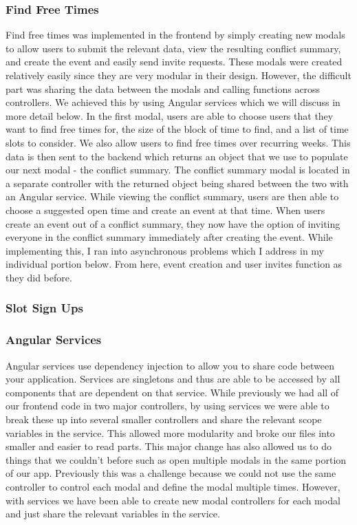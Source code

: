 \documentclass[11pt]{article}   %
\begin{document}
\subsubsection{Find Free Times}
Find free times was implemented in the frontend by simply creating new modals to allow users to submit the relevant data, view the resulting conflict summary, and create the event and easily send invite requests. These modals were created relatively easily since they are very modular in their design. However, the difficult part was sharing the data between the modals and calling functions across controllers. We achieved this by using Angular services which we will discuss in more detail below. In the first modal, users are able to choose users that they want to find free times for, the size of the block of time to find, and a list of time slots to consider. We also allow users to find free times over recurring weeks. This data is then sent to the backend which returns an object that we use to populate our next modal - the conflict summary. The conflict summary modal is located in a separate controller with the returned object being shared between the two with an Angular service. While viewing the conflict summary, users are then able to choose a suggested open time and create an event at that time. When users create an event out of a conflict summary, they now have the option of inviting everyone in the conflict summary immediately after creating the event. While implementing this, I ran into asynchronous problems which I address in my individual portion below. From here, event creation and user invites function as they did before.

\subsubsection{Slot Sign Ups}

\subsubsection{Angular Services}

Angular services use dependency injection to allow you to share code between your application. Services are singletons and thus are able to be accessed by all components that are dependent on that service. While previously we had all of our frontend code in two major controllers, by using services we were able to break these up into several smaller controllers and share the relevant scope variables in the service. This allowed more modularity and broke our files into smaller and easier to read parts. This major change has also allowed us to do things that we couldn't before such as open multiple modals in the same portion of our app. Previously this was a challenge because we could not use the same controller to control each modal and define the modal multiple times. However, with services we have been able to create new modal controllers for each modal and just share the relevant variables in the service.
\end{document}
